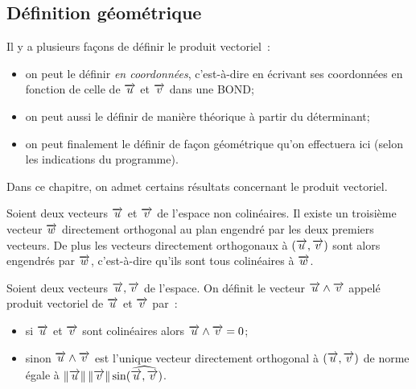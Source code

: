 \subsection{Définition géométrique}
Il y a plusieurs façons de définir le produit vectoriel~:
\begin{itemize}
\item on peut le définir \emph{en coordonnées}, c'est-à-dire en écrivant ses coordonnées en fonction de celle de \(\overrightarrow{u}\) et \(\overrightarrow{v}\) dans une BOND;
\item on peut aussi le définir de manière théorique à partir du déterminant;
\item on peut finalement le définir de façon géométrique qu'on effectuera ici (selon les indications du programme).
\end{itemize}
Dans ce chapitre, on admet certains résultats concernant le produit vectoriel.
\begin{prop}[admise]
 Soient deux vecteurs \(\overrightarrow{u}\) et \(\overrightarrow{v}\) de l'espace non colinéaires. Il existe un troisième vecteur \(\overrightarrow{w}\) directement orthogonal au plan engendré par les deux premiers vecteurs. De plus les vecteurs directement orthogonaux à \((\overrightarrow{u},\overrightarrow{v})\) sont alors engendrés par \(\overrightarrow{w}\), c'est-à-dire qu'ils sont tous colinéaires à \(\overrightarrow{w}\).
\end{prop}
\begin{defdef}
  Soient deux vecteurs \(\overrightarrow{u}, \overrightarrow{v}\) de l'espace. On définit le vecteur \(\overrightarrow{u} \wedge \overrightarrow{v}\) appelé produit vectoriel de \(\overrightarrow{u}\) et \(\overrightarrow{v}\) par~:
  \begin{itemize}
  \item si \(\overrightarrow{u}\) et \(\overrightarrow{v}\)  sont colinéaires alors \(\overrightarrow{u} \wedge \overrightarrow{v}=0\);
  \item sinon \(\overrightarrow{u} \wedge \overrightarrow{v}\) est l'unique vecteur directement orthogonal à \((\overrightarrow{u},\overrightarrow{v})\) de norme égale à \(\left\lVert\overrightarrow{u}\right\rVert\left\lVert\overrightarrow{v}\right\rVert\sin(\widehat{\overrightarrow{u},\overrightarrow{v}})\).
  \end{itemize}
\end{defdef}


